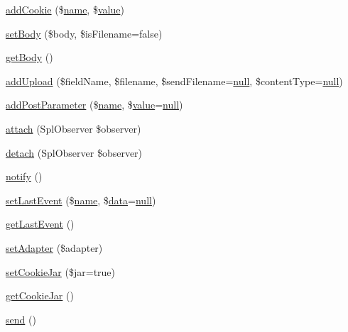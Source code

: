 \begin{DoxyCompactItemize}
\item 
\hyperlink{classHTTP__Request2_aeb8d7d755804ae328a7941be4d56aff7}{add\+Cookie} (\$\hyperlink{common_8js_a22c29d2aa8ed6161ce8faa718ef76e68}{name}, \$\hyperlink{common_2js_2jquery_8js_abe5393d870043cf6aaa1d5ad5fce755c}{value})
\item 
\hyperlink{classHTTP__Request2_acff40db54d3829648859a2832f93a004}{set\+Body} (\$body, \$is\+Filename=false)
\item 
\hyperlink{classHTTP__Request2_a206f758763ed28dce4341babf5c932d0}{get\+Body} ()
\item 
\hyperlink{classHTTP__Request2_ac8e89d3a20ba389c4781f1e5adf58e04}{add\+Upload} (\$field\+Name, \$filename, \$send\+Filename=\hyperlink{modernizr_8min_8js_a286f9ec831c5e676eeb493248eab9575}{null}, \$content\+Type=\hyperlink{modernizr_8min_8js_a286f9ec831c5e676eeb493248eab9575}{null})
\item 
\hyperlink{classHTTP__Request2_a45a950fb625fe85fedd123fc95cff92d}{add\+Post\+Parameter} (\$\hyperlink{common_8js_a22c29d2aa8ed6161ce8faa718ef76e68}{name}, \$\hyperlink{common_2js_2jquery_8js_abe5393d870043cf6aaa1d5ad5fce755c}{value}=\hyperlink{modernizr_8min_8js_a286f9ec831c5e676eeb493248eab9575}{null})
\item 
\hyperlink{classHTTP__Request2_a91ff31f582d0156df454685e60b72e1c}{attach} (Spl\+Observer \$observer)
\item 
\hyperlink{classHTTP__Request2_a43da613f3526bfe033f5fafd58f9c50c}{detach} (Spl\+Observer \$observer)
\item 
\hyperlink{classHTTP__Request2_af35a8a6eb99219760dddd6223599a8ef}{notify} ()
\item 
\hyperlink{classHTTP__Request2_a1c05aea3c3857ad8f4c6a0a9eb33911d}{set\+Last\+Event} (\$\hyperlink{common_8js_a22c29d2aa8ed6161ce8faa718ef76e68}{name}, \$\hyperlink{document__category_8js_a94b4f25375ac17cb917012e05bf514a7}{data}=\hyperlink{modernizr_8min_8js_a286f9ec831c5e676eeb493248eab9575}{null})
\item 
\hyperlink{classHTTP__Request2_afe70adf8c72a426f80ce66b4170e0f61}{get\+Last\+Event} ()
\item 
\hyperlink{classHTTP__Request2_a27fadfa673c3317675ab78b5df99264a}{set\+Adapter} (\$adapter)
\item 
\hyperlink{classHTTP__Request2_a396fdfdb92d2cb5dce1c8230919eb5d4}{set\+Cookie\+Jar} (\$jar=true)
\item 
\hyperlink{classHTTP__Request2_ad56d5f45235cb4f753d1ee9c7cd4c0e0}{get\+Cookie\+Jar} ()
\item 
\hyperlink{classHTTP__Request2_a0c8dee043682c61c0f1dc1558ea64d36}{send} ()
\end{DoxyCompactItemize}
